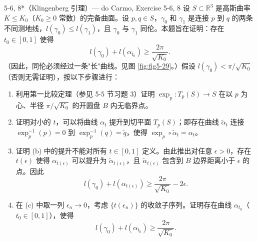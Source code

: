 \begin{exercise}{5-6, 8*（Klingenberg 引理）— do Carmo, Exercise 5-6, 8}
设 $S \subset \mathbb{R}^3$ 是高斯曲率 $K \leq K_0$（$K_0\geq 0$ 常数）的完备曲面。设 $p,q \in S$，$\gamma_0$ 和 $\gamma_1$ 是连接 $p$ 到 $q$ 的两条不同测地线，$l(\gamma_0) \leq l(\gamma_1)$，且 $\gamma_0$ 与 $\gamma_1$ 同伦。本题旨在证明：存在 $t_0 \in [0,1]$ 使得
\[
l(\gamma_0) + l(\alpha_{t_0}) \geq \frac{2\pi}{\sqrt{K_0}}.
\]
（因此，同伦必须经过一条"长"曲线。见图 \cref{fig:fig5-29}。）假设 $l(\gamma_0) < \pi/\sqrt{K_0}$（否则无需证明），按以下步骤进行：

\begin{enumerate}
\item[(a)] 利用第一比较定理（参见 5-5 节习题 3）证明 $\exp_p: T_p(S) \to S$ 在以 $p$ 为心、半径 $\pi/\sqrt{K_0}$ 的开圆盘 $B$ 内无临界点。
\item[(b)] 证明对小的 $t$，可以将曲线 $\alpha_t$ 提升到切平面 $T_p(S)$；即存在曲线 $\tilde{\alpha}_t$ 连接 $\exp_p^{-1}(p) = 0$ 到 $\exp_p^{-1}(q) = \tilde{q}$，使得 $\exp_p \circ \tilde{\alpha}_t = \alpha_t$。
\item[(c)] 证明 (b) 中的提升不能对所有 $t \in [0,1]$ 定义。由此推出对任意 $\epsilon > 0$，存在 $t(\epsilon)$ 使得 $\alpha_{t(\epsilon)}$ 可以提升为 $\tilde{\alpha}_{t(\epsilon)}$，且 $\tilde{\alpha}_{t(\epsilon)}$ 包含到 $B$ 边界距离小于 $\epsilon$ 的点。因此
\[
l(\gamma_0) + l(\alpha_{t(\epsilon)}) \geq \frac{2\pi}{\sqrt{K_0}} - 2\epsilon.
\]
\item[(d)] 在 (c) 中取一列 $\epsilon_n \to 0$，考虑 $\{t(\epsilon_n)\}$ 的收敛子序列。证明存在曲线 $\alpha_{t_0}$（$t_0 \in [0,1]$），使得
\[
l(\gamma_0) + l(\alpha_{t_0}) \geq \frac{2\pi}{\sqrt{K_0}}.
\]
\end{enumerate}
\end{exercise}
